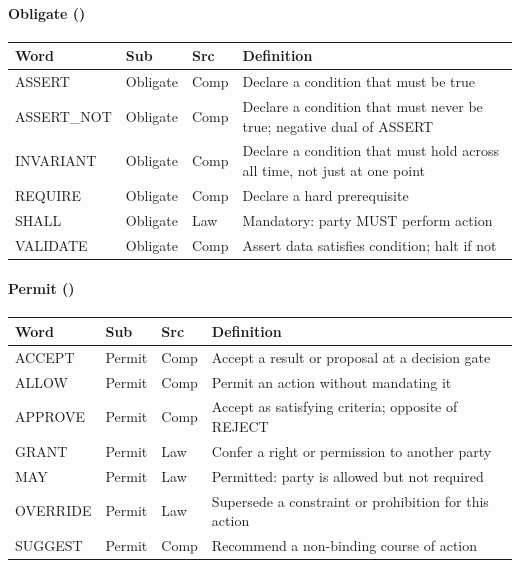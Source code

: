 \documentclass{article}
\begin{document}
\paragraph{Obligate (\VocabVerbsObligate)}
\small
\begin{tabular}{lllp{7cm}}
\toprule \textbf{Word} & \textbf{Sub} & \textbf{Src} & \textbf{Definition} \\ \midrule
ASSERT & Obligate & Comp & Declare a condition that must be true \\
ASSERT\_NOT & Obligate & Comp & Declare a condition that must never be true; negative dual of ASSERT \\
INVARIANT & Obligate & Comp & Declare a condition that must hold across all time, not just at one point \\
REQUIRE & Obligate & Comp & Declare a hard prerequisite \\
SHALL & Obligate & Law & Mandatory: party MUST perform action \\
VALIDATE & Obligate & Comp & Assert data satisfies condition; halt if not \\
\bottomrule
\end{tabular}
\normalsize

\paragraph{Permit (\VocabVerbsPermit)}
\small
\begin{tabular}{lllp{7cm}}
\toprule \textbf{Word} & \textbf{Sub} & \textbf{Src} & \textbf{Definition} \\ \midrule
ACCEPT & Permit & Comp & Accept a result or proposal at a decision gate \\
ALLOW & Permit & Comp & Permit an action without mandating it \\
APPROVE & Permit & Comp & Accept as satisfying criteria; opposite of REJECT \\
GRANT & Permit & Law & Confer a right or permission to another party \\
MAY & Permit & Law & Permitted: party is allowed but not required \\
OVERRIDE & Permit & Law & Supersede a constraint or prohibition for this action \\
SUGGEST & Permit & Comp & Recommend a non-binding course of action \\
\bottomrule
\end{tabular}
\normalsize
\end{document}
